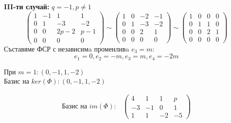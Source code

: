 \documentclass{article}
\begin{document}
\textbf{III-ти случай:} $q=-1, p\neq1$
\[
    \left(\begin{array}{cccc}
            1 & -1 & 1    & 1   \\
            0 & 1  & -3   & -2  \\
            0 & 0  & 2p-2 & p-1 \\
            0 & 0  & 0    & 0
        \end{array}\right)
    \sim\left(\begin{array}{cccc}
            1 & 0 & -2 & -1 \\
            0 & 1 & -3 & -2 \\
            0 & 0 & 2  & 1  \\
            0 & 0 & 0  & 0
        \end{array}\right)
    \sim\left(\begin{array}{cccc}
            1 & 0 & 0 & 0 \\
            0 & 1 & 1 & 0 \\
            0 & 0 & 2 & 1 \\
            0 & 0 & 0 & 0
        \end{array}\right)
\]
Съставяме ФСР с независимa променливa $e_3=m$:
\[
    e_1=0, e_2=-m, e_3=m, e_4=-2m
\]
\begin{center}
    При $m=1:(0,-1,1,-2)$\\
    Базис на $ker(\Phi):(0,-1,1,-2)$
\end{center}
\begin{align*}
    \text{Базис на $im(\Phi):$}
     & \left(\begin{array}{cccc}
                     4  & 1  & 1  & p  \\
                     -3 & -1 & 0  & 1  \\
                     1  & 1  & -2 & -5
                 \end{array}
    \right)
\end{align*}
\end{document}
